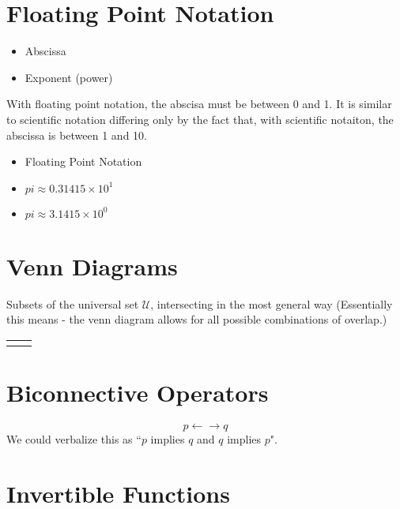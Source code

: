 \section*{Floating Point Notation}

\begin{itemize}
\item Abscissa 
\item Exponent (power)
\end{itemize}

With floating point notation, the abscisa must be between 0 and 1.
It is similar to scientific notation differing only by the fact that, with scientific notaiton, the abscissa is between 1 and 10.

\begin{itemize}
\item Floating Point Notation
\item $pi \approx 0.31415 \times 10^1$
\item $pi \approx 3.1415 \times 10^0$
\end{itemize}
\section*{Venn Diagrams}

Subsets of the universal set $\mathcal{U}$, intersecting in the most general way (Essentially this means - the venn diagram allows for all possible combinations of overlap.)

\begin{center}
\begin{tabular}{|c|c|}
\hline  &  \\ 
\hline  &  \\ 
\hline 
\end{tabular} 
\end{center}

\section*{Biconnective Operators}

\[ p \leftarrow \rightarrow q\]
We could verbalize this as ``$p$ implies $q$ and $q$ implies $p$".


\section*{Invertible Functions}


